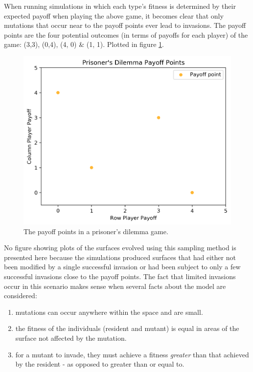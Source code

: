 \documentclass[11pt]{book}
\newcommand*{\np}{\par\noindent\newline}
\begin{document}
\np When running simulations in which each type's fitness is determined by their expected payoff when playing the above game,
it becomes clear that only mutations that occur near to the payoff points ever lead to invasions.
The payoff points are the four potential outcomes (in terms of payoffs for each player) of the game: (3,3), (0,4), (4, 0) \& (1, 1).
Plotted in figure \ref{prisoners_payoff_plot}.
\begin{figure}
	\centering
	\includegraphics[scale=0.7]{resources/prisoners_dilemma_payoffs.png}
	\caption{The payoff points in a prisoner's dilemma game.}
	\label{prisoners_payoff_plot}
\end{figure}

\np No figure showing plots of the surfaces evolved using this sampling method is presented here because the simulations 
produced surfaces that had either not been modified by a single successful invasion or had been subject to only a few successful invasions close to the payoff points.
The fact that limited invasions occur in this scenario makes sense when several facts about the model are considered:
\begin{enumerate}[label=(\alph*)]
	\item mutations can occur anywhere within the space and are small.
	\item the fitness of the individuals (resident and mutant) is equal in areas of the surface not affected by the mutation.
	\item for a mutant to invade, they must achieve a fitness \textit{greater} than that achieved by the resident - as opposed to greater than or equal to.	
\end{enumerate} 
\end{document}
